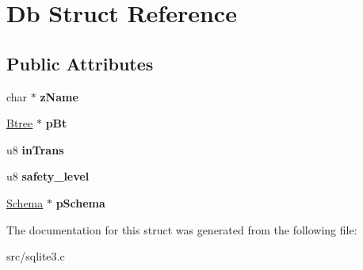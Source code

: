 \hypertarget{struct_db}{\section{Db Struct Reference}
\label{struct_db}
}
\subsection*{Public Attributes}
\begin{DoxyCompactItemize}
\item 
\hypertarget{struct_db_a6df2b5d7c8fd68e92cea961d9e3b279b}{char $\ast$ {\bfseries z\-Name}}\label{struct_db_a6df2b5d7c8fd68e92cea961d9e3b279b}

\item 
\hypertarget{struct_db_a0633e5a6abfc39246d07cc6a417a5852}{\hyperlink{struct_btree}{Btree} $\ast$ {\bfseries p\-Bt}}\label{struct_db_a0633e5a6abfc39246d07cc6a417a5852}

\item 
\hypertarget{struct_db_a4c5495ebea317212f0b41aa2795a7bc9}{u8 {\bfseries in\-Trans}}\label{struct_db_a4c5495ebea317212f0b41aa2795a7bc9}

\item 
\hypertarget{struct_db_a04597a5c023d8b328193450b177ff24c}{u8 {\bfseries safety\-\_\-level}}\label{struct_db_a04597a5c023d8b328193450b177ff24c}

\item 
\hypertarget{struct_db_afd8647a83a4a7053231b92814520d6d4}{\hyperlink{struct_schema}{Schema} $\ast$ {\bfseries p\-Schema}}\label{struct_db_afd8647a83a4a7053231b92814520d6d4}

\end{DoxyCompactItemize}


The documentation for this struct was generated from the following file\-:\begin{DoxyCompactItemize}
\item 
src/sqlite3.\-c\end{DoxyCompactItemize}
